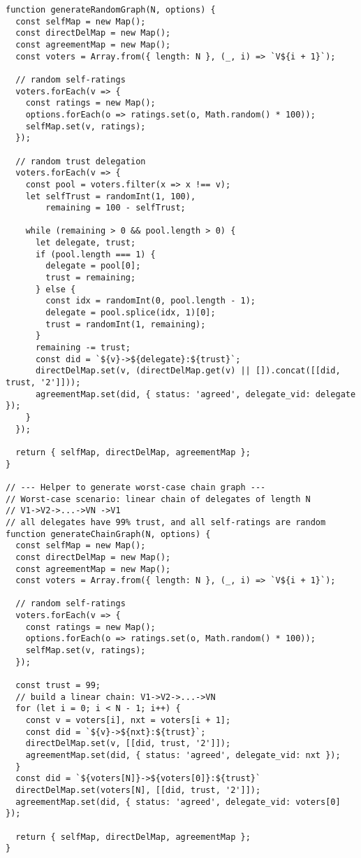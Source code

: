 \begin{verbatim}
function generateRandomGraph(N, options) {
  const selfMap = new Map();
  const directDelMap = new Map();
  const agreementMap = new Map();
  const voters = Array.from({ length: N }, (_, i) => `V${i + 1}`);

  // random self-ratings
  voters.forEach(v => {
    const ratings = new Map();
    options.forEach(o => ratings.set(o, Math.random() * 100));
    selfMap.set(v, ratings);
  });

  // random trust delegation
  voters.forEach(v => {
    const pool = voters.filter(x => x !== v);
    let selfTrust = randomInt(1, 100),
        remaining = 100 - selfTrust;

    while (remaining > 0 && pool.length > 0) {
      let delegate, trust;
      if (pool.length === 1) {
        delegate = pool[0];
        trust = remaining;
      } else {
        const idx = randomInt(0, pool.length - 1);
        delegate = pool.splice(idx, 1)[0];
        trust = randomInt(1, remaining);
      }
      remaining -= trust;
      const did = `${v}->${delegate}:${trust}`;
      directDelMap.set(v, (directDelMap.get(v) || []).concat([[did, trust, '2']]));
      agreementMap.set(did, { status: 'agreed', delegate_vid: delegate });
    }
  });

  return { selfMap, directDelMap, agreementMap };
}

// --- Helper to generate worst-case chain graph ---
// Worst-case scenario: linear chain of delegates of length N
// V1->V2->...->VN ->V1 
// all delegates have 99% trust, and all self-ratings are random
function generateChainGraph(N, options) {
  const selfMap = new Map();
  const directDelMap = new Map();
  const agreementMap = new Map();
  const voters = Array.from({ length: N }, (_, i) => `V${i + 1}`);

  // random self-ratings
  voters.forEach(v => {
    const ratings = new Map();
    options.forEach(o => ratings.set(o, Math.random() * 100));
    selfMap.set(v, ratings);
  });

  const trust = 99;
  // build a linear chain: V1->V2->...->VN
  for (let i = 0; i < N - 1; i++) {
    const v = voters[i], nxt = voters[i + 1];
    const did = `${v}->${nxt}:${trust}`;
    directDelMap.set(v, [[did, trust, '2']]);
    agreementMap.set(did, { status: 'agreed', delegate_vid: nxt });
  }
  const did = `${voters[N]}->${voters[0]}:${trust}`
  directDelMap.set(voters[N], [[did, trust, '2']]);
  agreementMap.set(did, { status: 'agreed', delegate_vid: voters[0] });

  return { selfMap, directDelMap, agreementMap };
}


\end{verbatim}
